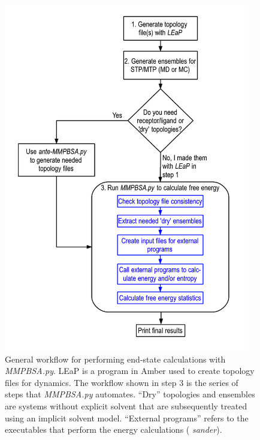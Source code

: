 \begin{figure}
   \includegraphics[height=6in, width=4.24in]{MMPBSA_Workflow.png}
   \caption[General workflow for performing end-state calculations with
            \emph{MMPBSA.py}. LEaP is a program in Amber used to create topology
            files for dynamics.]
           {General workflow for performing end-state calculations with
            \emph{MMPBSA.py}. LEaP is a program in Amber used to create topology
            files for dynamics. The workflow shown in step 3 is the series of
            steps that \emph{MMPBSA.py} automates. ``Dry'' topologies and
            ensembles are systems without explicit solvent that are subsequently
            treated using an implicit solvent model. ``External programs''
            refers to the executables that perform the energy calculations (\eg
            \emph{sander}).}
   \label{fig6:MMPBSA_Workflow}
\end{figure}

